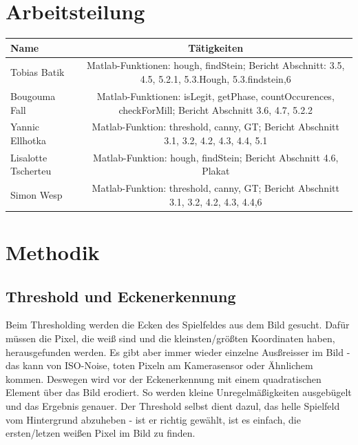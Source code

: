 \documentclass[paper=A4, deutsch]{scrartcl}
\begin{document}
\section{Arbeitsteilung}
\begin{center}
  \begin{tabular}{ |l | c | }
    \hline
  Name & Tätigkeiten\\
    \hline
			Tobias Batik & Matlab-Funktionen: hough, findStein; Bericht Abschnitt: 3.5, 4.5, 5.2.1, 5.3.Hough, 5.3.findstein,6\\
		\hline
			Bougouma Fall & Matlab-Funktionen: isLegit, getPhase, countOccurences, checkForMill; Bericht Abschnitt 3.6, 4.7, 5.2.2\\
		\hline
			Yannic Ellhotka & Matlab-Funktion: threshold, canny, GT; Bericht Abschnitt 3.1, 3.2, 4.2, 4.3, 4.4, 5.1\\
		\hline
			Lisalotte Tscherteu & Matlab-Funktion: hough, findStein; Bericht Abschnitt 4.6, Plakat\\
		\hline
			Simon Wesp & Matlab-Funktion: threshold, canny, GT; Bericht Abschnitt 3.1, 3.2, 4.2, 4.3, 4.4,6\\
		\hline
  \end{tabular}
\end{center}


\section{Methodik}

\subsection{Threshold und Eckenerkennung}
Beim Thresholding werden die Ecken des Spielfeldes aus dem Bild gesucht. Dafür müssen die Pixel, die weiß sind und die kleinsten/größten Koordinaten haben, herausgefunden werden. Es gibt aber immer wieder einzelne Ausßreisser im Bild - das kann von ISO-Noise, toten Pixeln am Kamerasensor oder Ähnlichem kommen. Deswegen wird vor der Eckenerkennung mit einem quadratischen Element über das Bild erodiert. So werden kleine Unregelmäßigkeiten ausgebügelt und das Ergebnis genauer. Der Threshold selbst dient dazul, das helle Spielfeld vom Hintergrund abzuheben - ist er richtig gewählt, ist es einfach, die ersten/letzen weißen Pixel im Bild zu finden.
\end{document}
